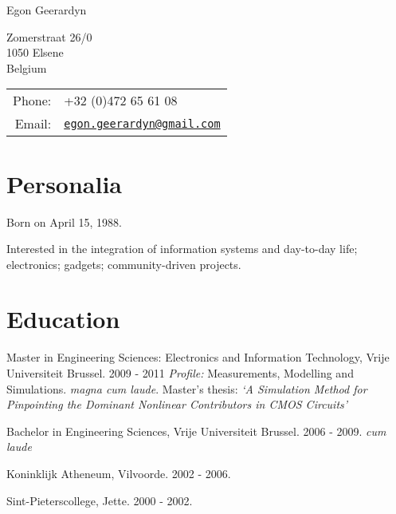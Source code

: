 \documentclass[a4paper]{article}
\def\name{Egon Geerardyn}
\renewenvironment{itemize}{
  \begin{list}{}{
    \setlength{\leftmargin}{1.5em}
  }
}{
  \end{list}
}
\begin{document}
{\huge \name}


\vspace{0.25in}

\begin{minipage}{0.30\linewidth}
  Zomerstraat 26/0 \\
  1050 Elsene\\
  Belgium
\end{minipage}
\begin{minipage}{0.55\linewidth}
  \begin{tabular}{rl}
    Phone: & +32 (0)472 65 61 08\\
    Email: & \href{mailto:egon.geerardyn@gmail.com}{\tt egon.geerardyn@gmail.com} \\
  \end{tabular}
\end{minipage}


\section*{Personalia}

\begin{itemize}
\item Born on April 15, 1988.
\item Interested in the integration of information systems and day-to-day life; electronics; gadgets; community-driven projects.
\end{itemize}


\section*{Education}
\begin{itemize}
  \item Master in Engineering Sciences: Electronics and Information Technology, Vrije Universiteit Brussel. 2009 - 2011
         \textit{Profile:} Measurements, Modelling and Simulations. \textit{magna cum laude}.
         Master's thesis: \textit{`A Simulation Method for Pinpointing the Dominant Nonlinear Contributors in CMOS Circuits'}
  \item Bachelor in Engineering Sciences, Vrije Universiteit Brussel. 2006 - 2009. \textit{cum laude}
  \item Koninklijk Atheneum, Vilvoorde. 2002 - 2006.
  \item Sint-Pieterscollege, Jette. 2000 - 2002.
\end{itemize}
\end{document}
